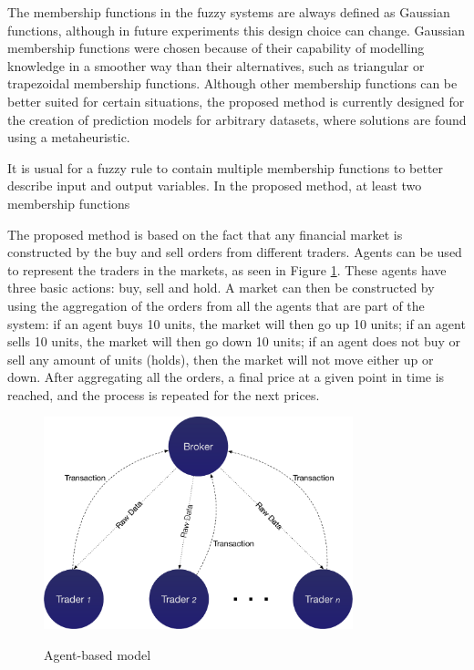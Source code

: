 \documentclass[review]{elsarticle}
\begin{document}
The membership functions in the fuzzy systems are always defined as Gaussian
functions, although in future experiments this design choice can
change. Gaussian membership functions were chosen because of their capability of
modelling knowledge in a smoother way than their alternatives, such as
triangular or trapezoidal membership functions. Although other membership
functions can be better suited for certain situations, the proposed method is
currently designed for the creation of prediction models for arbitrary datasets,
where solutions are found using a metaheuristic.

It is usual for a fuzzy rule to contain multiple membership functions to better describe input and output variables. In the proposed method, at least two membership functions




The proposed method is based on the fact that any financial market is constructed by the buy and sell orders from different traders. Agents can be used to represent the traders in the markets, as seen in Figure \ref{figure:agent-based-model}. These agents have three basic actions: buy, sell and hold. A market can then be constructed by using the aggregation of the orders from all the agents that are part of the system: if an agent buys 10 units, the market will then go up 10 units; if an agent sells 10 units, the market will then go down 10 units; if an agent does not buy or sell any amount of units (holds), then the market will not move either up or down. After aggregating all the orders, a final price at a given point in time is reached, and the process is repeated for the next prices.

\begin{figure}
\caption{Agent-based model}
\centering
\includegraphics[width=0.8\textwidth]{img/agent-model.pdf}
\label{figure:agent-based-model}
\end{figure}
\end{document}
